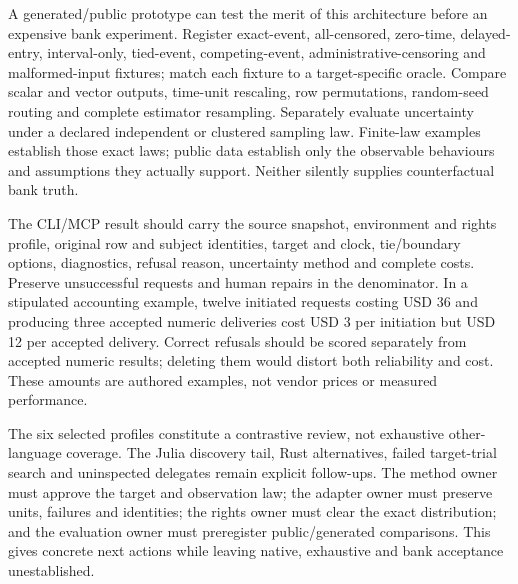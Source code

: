 A generated/public prototype can test the merit of this architecture before an
expensive bank experiment. Register exact-event, all-censored, zero-time, delayed-entry,
interval-only, tied-event, competing-event, administrative-censoring and malformed-input
fixtures; match each fixture to a target-specific oracle. Compare scalar and vector
outputs, time-unit rescaling, row permutations, random-seed routing and complete
estimator resampling. Separately evaluate uncertainty under a declared independent
or clustered sampling law. Finite-law examples establish those exact laws; public
data establish only the observable behaviours and assumptions they actually support.
Neither silently supplies counterfactual bank truth.

The CLI/MCP result should carry the source snapshot, environment and rights profile,
original row and subject identities, target and clock, tie/boundary options, diagnostics,
refusal reason, uncertainty method and complete costs. Preserve unsuccessful requests
and human repairs in the denominator. In a stipulated accounting example, twelve
initiated requests costing USD 36 and producing three accepted numeric deliveries
cost USD 3 per initiation but USD 12 per accepted delivery. Correct refusals should
be scored separately from accepted numeric results; deleting them would distort
both reliability and cost. These amounts are authored examples, not vendor prices
or measured performance.\citep{exec24_survivalother_reference}

The six selected profiles constitute a contrastive review, not exhaustive
other-language coverage. The Julia discovery tail, Rust alternatives, failed
target-trial search and uninspected delegates remain explicit follow-ups. The method
owner must approve the target and observation law; the adapter owner must preserve
units, failures and identities; the rights owner must clear the exact distribution;
and the evaluation owner must preregister public/generated comparisons. This gives
concrete next actions while leaving native, exhaustive and bank acceptance unestablished.
